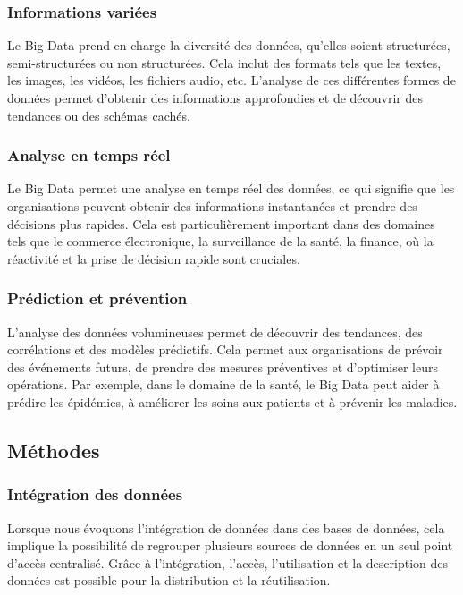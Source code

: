 \documentclass{article}
\begin{document}
	\subsubsection{Informations variées}
	Le Big Data prend en charge la diversité des données, qu’elles soient structurées, semi-structurées ou non structurées. Cela inclut des formats tels que les textes, les images, les vidéos, les fichiers audio, etc. L’analyse de ces différentes formes de données permet d’obtenir des informations approfondies et de découvrir des tendances ou des schémas cachés.
	
	\subsubsection{Analyse en temps réel}
	Le Big Data permet une analyse en temps réel des données, ce qui signifie que les organisations peuvent obtenir des informations instantanées et prendre des décisions plus rapides. Cela est particulièrement important dans des domaines tels que le commerce électronique, la surveillance de la santé, la finance, où la réactivité et la prise de décision rapide sont cruciales.
	
	\subsubsection{Prédiction et prévention}
	L’analyse des données volumineuses permet de découvrir des tendances, des corrélations et des modèles prédictifs. Cela permet aux organisations de prévoir des événements futurs, de prendre des mesures préventives et d’optimiser leurs opérations. Par exemple, dans le domaine de la santé, le Big Data peut aider à prédire les épidémies, à améliorer les soins aux patients et à prévenir les maladies.
	
	\subsection{Méthodes}
	\subsubsection{Intégration des données}
	Lorsque nous évoquons l’intégration de données dans des bases de données, cela implique la possibilité de regrouper plusieurs sources de données en un seul point d’accès centralisé. Grâce à l’intégration, l’accès, l’utilisation et la description des données est possible pour la distribution et la réutilisation.
	
\end{document}
